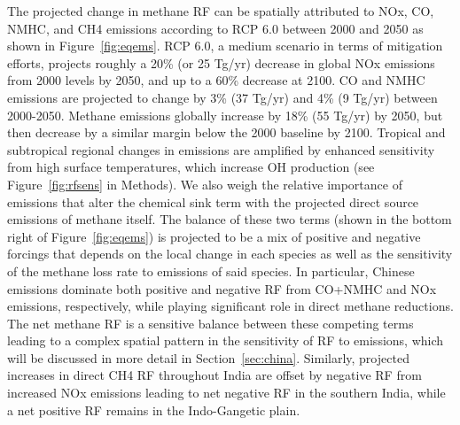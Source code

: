 The projected change in methane RF can be spatially attributed to NOx, CO, NMHC, and CH4 emissions according to RCP 6.0 between 2000 and 2050 as shown in Figure~\ref{fig:eqems}. RCP 6.0, a medium scenario in terms of mitigation efforts, projects roughly a 20\% (or 25 Tg/yr) decrease in global NOx emissions from 2000 levels by 2050, and up to a 60\% decrease at 2100. CO and NMHC emissions are projected to change by 3\% (37 Tg/yr) and 4\% (9 Tg/yr) between 2000-2050. Methane emissions globally increase by 18\% (55 Tg/yr) by 2050, but then decrease by a similar margin below the 2000 baseline by 2100. Tropical and subtropical regional changes in emissions are amplified by enhanced sensitivity from high surface temperatures, which increase OH production (see Figure~\ref{fig:rfsens} in Methods). We also weigh the relative importance of emissions that alter the chemical sink term with the projected direct source emissions of methane itself. The balance of these two terms (shown in the bottom right of Figure~\ref{fig:eqems}) is projected to be a mix of positive and negative forcings that depends on the local change in each species as well as the sensitivity of the methane loss rate to emissions of said species. In particular, Chinese emissions dominate both positive and negative RF from CO+NMHC and NOx emissions, respectively, while playing significant role in direct methane reductions.  The net methane RF is a sensitive balance between these competing terms leading to a complex spatial pattern in the sensitivity of RF to emissions, which will be discussed in more detail in Section~\ref{sec:china}.  Similarly, projected increases in direct CH4 RF throughout India are offset by negative RF from increased NOx emissions leading to net negative RF in the southern India, while a net positive RF remains in the Indo-Gangetic plain.  

